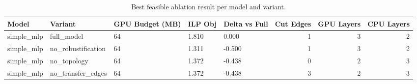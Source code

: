 \begin{table}[t]
\centering
\caption{Best feasible ablation result per model and variant.}
\label{tab:ilp-ablation-best-per-variant}
\begin{tabular}{lllllrrr}
\toprule
Model & Variant & GPU Budget (MB) & ILP Obj & Delta vs Full & Cut Edges & GPU Layers & CPU Layers \\
\midrule
simple_mlp & full_model & 64 & 1.810 & 0.000 & 1 & 3 & 2 \\
simple_mlp & no_robustification & 64 & 1.311 & -0.500 & 1 & 3 & 2 \\
simple_mlp & no_topology & 64 & 1.372 & -0.438 & 0 & 2 & 3 \\
simple_mlp & no_transfer_edges & 64 & 1.372 & -0.438 & 3 & 2 & 3 \\
\bottomrule
\end{tabular}

\end{table}
